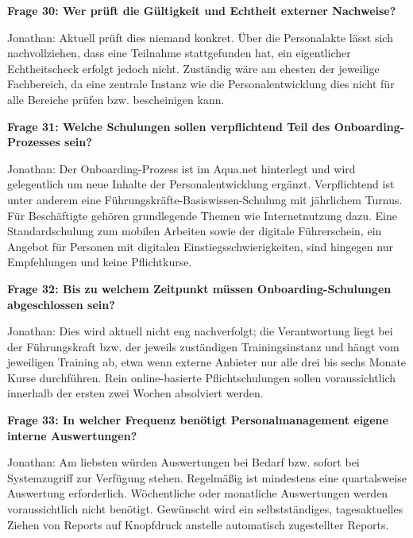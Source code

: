 \documentclass[
    12pt, 
    a4paper,
    ]{scrartcl} %
\begin{document}
\medskip
\textbf{Frage 30: Wer pr\"uft die G\"ultigkeit und Echtheit externer Nachweise?}

Jonathan: Aktuell pr\"uft dies niemand konkret. \"Uber die Personalakte l\"asst sich nachvollziehen, dass eine Teilnahme stattgefunden hat, ein eigentlicher Echtheitscheck erfolgt jedoch nicht. Zust\"andig w\"are am ehesten der jeweilige Fachbereich, da eine zentrale Instanz wie die Personalentwicklung dies nicht f\"ur alle Bereiche pr\"ufen bzw. bescheinigen kann.

\bigskip
{}

\textbf{Frage 31: Welche Schulungen sollen verpflichtend Teil des Onboarding-Prozesses sein?}

Jonathan: Der Onboarding-Prozess ist im Aqua.net hinterlegt und wird gelegentlich um neue Inhalte der Personalentwicklung erg\"anzt. Verpflichtend ist unter anderem eine F\"uhrungskr\"afte-Basiswissen-Schulung mit j\"ahrlichem Turnus. F\"ur Besch\"aftigte geh\"oren grundlegende Themen wie Internetnutzung dazu. Eine Standardschulung zum mobilen Arbeiten sowie der digitale F\"uhrerschein, ein Angebot f\"ur Personen mit digitalen Einstiegsschwierigkeiten, sind hingegen nur Empfehlungen und keine Pflichtkurse.

\medskip
\textbf{Frage 32: Bis zu welchem Zeitpunkt m\"ussen Onboarding-Schulungen abgeschlossen sein?}

Jonathan: Dies wird aktuell nicht eng nachverfolgt; die Verantwortung liegt bei der F\"uhrungskraft bzw. der jeweils zust\"andigen Trainingsinstanz und h\"angt vom jeweiligen Training ab, etwa wenn externe Anbieter nur alle drei bis sechs Monate Kurse durchf\"uhren. Rein online-basierte Pflichtschulungen sollen voraussichtlich innerhalb der ersten zwei Wochen absolviert werden.

\bigskip
{}

\textbf{Frage 33: In welcher Frequenz ben\"otigt Personalmanagement eigene interne Auswertungen?}

Jonathan: Am liebsten w\"urden Auswertungen bei Bedarf bzw. sofort bei Systemzugriff zur Verf\"ugung stehen. Regelm\"a{\ss}ig ist mindestens eine quartalsweise Auswertung erforderlich. W\"ochentliche oder monatliche Auswertungen werden voraussichtlich nicht ben\"otigt. Gew\"unscht wird ein selbstst\"andiges, tagesaktuelles Ziehen von Reports auf Knopfdruck anstelle automatisch zugestellter Reports.
\end{document}
